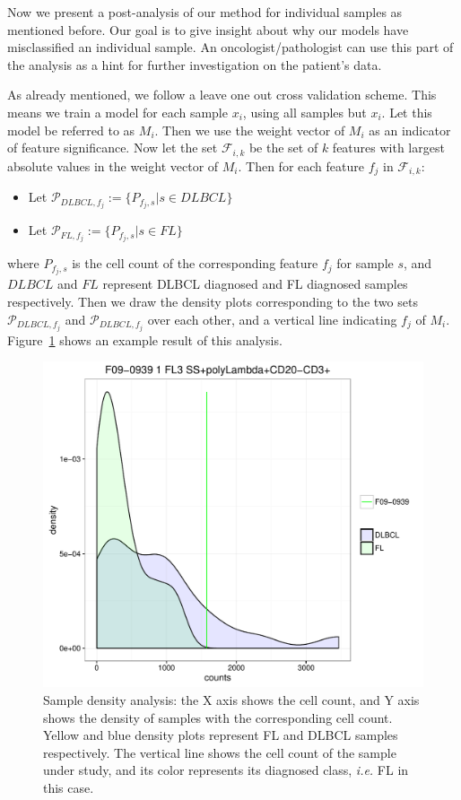 Now we present a post-analysis of our method for individual samples as mentioned before. Our goal is to give insight about why our models have misclassified an individual sample. An oncologist/pathologist can use this part of the analysis as a hint for further investigation on the patient's data.

As already mentioned, we follow a leave one out cross validation scheme. This means we train a model for each sample $x_i$, using all samples but $x_i$. Let this model be referred to as $M_i$. Then we use the weight vector of $M_i$ as an indicator of feature significance. Now let the set $\mathcal{F}_{i,k}$ be the set of $k$ features with largest absolute values in the weight vector of $M_i$. Then for each feature $f_j$ in $\mathcal{F}_{i,k}$:
\begin{itemize}
\item Let $\mathcal{P}_{DLBCL, f_j} := \{P_{f_j, s} | s \in DLBCL\}$
\item Let $\mathcal{P}_{FL, f_j} := \{P_{f_j, s} | s \in FL\}$
\end{itemize}

where $P_{f_j, s}$ is the cell count of the corresponding feature $f_j$ for sample $s$, and $DLBCL$ and $FL$ represent DLBCL diagnosed and FL diagnosed samples respectively. Then we draw the density plots corresponding to the two sets $\mathcal{P}_{DLBCL, f_j}$ and $\mathcal{P}_{DLBCL, f_j}$ over each other, and a vertical line indicating $f_j$ of $M_i$. Figure~\ref{fig:fcs-qa-sample-density} shows an example result of this analysis.

\begin{figure}[!ht]
  \centering
  \includegraphics[width=.6\textwidth]{figs/fcs-qa/density-analysis/F09-0939_tube1_0202000120_density}
  \caption{Sample density analysis: the X axis shows the cell count, and Y axis shows the density of samples with the corresponding cell count. Yellow and blue density plots represent FL and DLBCL samples respectively. The vertical line shows the cell count of the sample under study, and its color represents its diagnosed class, \emph{i.e.} FL in this case.}
  \label{fig:fcs-qa-sample-density}
\end{figure}

